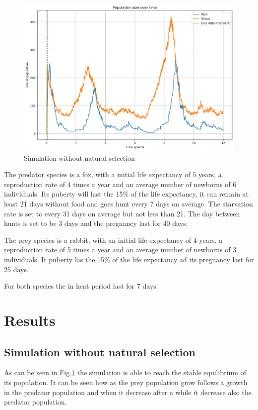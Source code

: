 \documentclass[conference]{IEEEtran}
\begin{document}
    \begin{figure}[!ht]
    \centering
    \includegraphics[width=\columnwidth]{media/0_11-02-2024_19-13-55-022905_pop_time_species}
    \caption[short]{Simulation without natural selection}
    \label{fig:no_sel}
    \end{figure}

    The predator species is a fox, with a initial life expectancy of 5 years, a reproduction rate of 4 times a year and an average number of newborns of 6 individuals. Its puberty will last the 15\% of the life expectancy, it can remain at least 21 days without food and goes hunt every 7 days on average. The starvation rate is set to every 31 days on average but not less than 21. The day between hunts is set to be 3 days and the pregnancy last for 40 days.

    The prey species is a rabbit, with an initial life expectancy of 4 years, a reproduction rate of 5 times a year and an average number of newborns of 3 individuals. It puberty las the 15\% of the life expectancy ad its pregnancy last for 25 days. 

    For both species the in heat period last for 7 days.

\section{Results}

    \subsection{Simulation without natural selection}

    As can be seen in Fig.\ref{fig:no_sel} the simulation is able to reach the stable equilibrium of its population. It can be seen how as the prey population grow follows a growth in the predator population and when it decrease after a while it decrease also the predator population.
\end{document}
